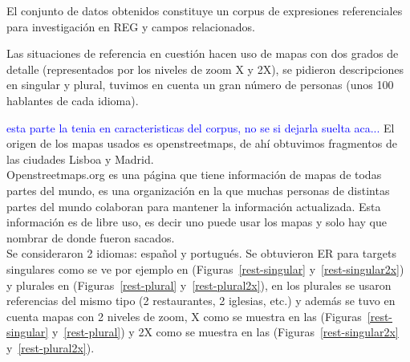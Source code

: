 El conjunto de datos obtenidos constituye un corpus de expresiones referenciales para investigaci\'on en REG y campos relacionados.

Las situaciones de referencia en cuesti\'on hacen uso de mapas con dos grados de detalle (representados por los niveles de zoom X y 2X), se pidieron descripciones en singular y plural, tuvimos en cuenta un gran n\'umero de personas (unos 100 hablantes de cada idioma).


\textcolor{blue}{esta parte la tenia en caracteristicas del corpus, no se si dejarla suelta aca...}
El origen de los mapas usados es openstreetmaps, de ah\'i obtuvimos fragmentos de las ciudades Lisboa y Madrid.\\

Openstreetmaps.org es una p\'agina que tiene informaci\'on de mapas de todas partes del mundo, es una organizaci\'on en la que muchas
 personas de distintas partes del mundo colaboran para mantener la informaci\'on actualizada. Esta informaci\'on es de libre uso, es decir uno puede usar los mapas y solo hay que nombrar de donde fueron sacados.\\

Se consideraron 2 idiomas: espa\~nol y portugu\'es. Se obtuvieron ER para targets singulares como se ve por ejemplo en (Figuras~\ref{rest-singular} y~\ref{rest-singular2x}) y plurales en (Figuras~\ref{rest-plural} y~\ref{rest-plural2x}), en los plurales se usaron referencias del mismo tipo (2 restaurantes, 2 iglesias, etc.) y adem\'as se tuvo en cuenta mapas con 2 niveles de zoom, X como se muestra en las (Figuras~\ref{rest-singular} y~\ref{rest-plural}) y 2X como se muestra en las (Figuras~\ref{rest-singular2x} y~\ref{rest-plural2x}).\\

